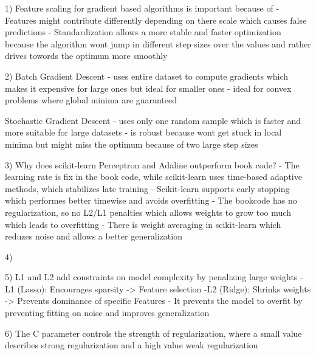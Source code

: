 1) Feature scaling for gradient based algorithms is important because of
    - Features might contribute differently depending on there scale which 
    causes false predictions
    - Standardization allows a more stable and faster optimization because 
    the algorithm wont jump in different step sizes over the values and 
    rather drives towords the optimum more smoothly

2) Batch Gradient Descent 
    - uses entire dataset to compute gradients which makes it expensive for large ones but 
    ideal for smaller ones
    - ideal for convex problems where global minima are guaranteed

    Stochastic Gradient Descent
    - uses only one random sample which is faster and more 
    suitable for large datasets
    - is robust because wont get stuck in local minima but 
    might miss the optimum because of two large step sizes

3) Why does scikit-learn Perceptron and Adaline outperform book code?
    - The learning rate is fix in the book code, while scikit-learn 
    uses time-based adaptive methods, which stabilizes late training
    - Scikit-learn supports early stopping which performes better 
    timewise and avoids overfitting
    - The bookcode has no regularization, so no L2/L1 penalties which 
    allows weights to grow too much which leads to overfitting
    - There is weight averaging in scikit-learn which reduzes noise 
    and allows a better generalization
    
4)

5) L1 and L2 add constraints on model complexity by penalizing large weights
        -L1 (Lasso): Encourages sparsity -> Feature selection
        -L2 (Ridge): Shrinks weights -> Prevents dominance of 
            specific Features
    - It prevents the model to overfit by preventing fitting on noise 
    and improves generalization

6) The C parameter controls the strength of regularization, where 
    a small value describes strong regularization and a high value weak 
    regularization
